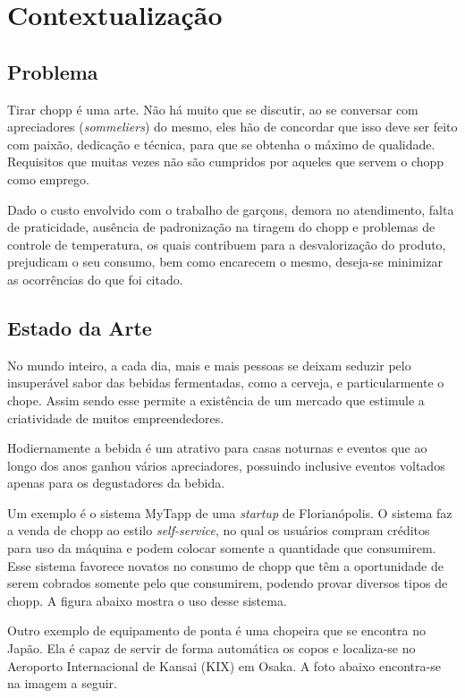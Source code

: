 \chapter[Contextualização]{Contextualização}

\section{Problema}

		Tirar chopp é uma arte.  Não há muito que se discutir, ao se conversar com apreciadores (\textit{sommeliers}) do mesmo,  eles hão de concordar que isso  deve ser feito com paixão, dedicação  e técnica, para que se obtenha o máximo de qualidade. Requisitos que muitas vezes não são cumpridos por aqueles que servem o chopp como emprego.
        
        Dado o custo  envolvido com o trabalho de garçons, demora no atendimento, falta de praticidade, ausência de padronização na tiragem do chopp e problemas de controle de temperatura, os quais contribuem para a desvalorização do produto, prejudicam o seu consumo, bem como encarecem o mesmo, deseja-se minimizar as ocorrências do que  foi citado. 


\section{Estado da Arte}

No mundo inteiro, a cada dia, mais e mais pessoas se deixam seduzir pelo insuperável sabor das bebidas fermentadas, como a cerveja, e particularmente o chope. Assim sendo esse permite a existência de um mercado que estimule a criatividade de muitos empreendedores.

Hodiernamente a bebida é um atrativo para casas noturnas e eventos que ao longo dos anos ganhou vários apreciadores, possuindo inclusive eventos voltados apenas para os degustadores da bebida. 

Um exemplo é o sistema MyTapp de uma \textit{startup} de Florianópolis.  O sistema faz a venda de chopp ao estilo \textit{self-service}, no qual os usuários compram créditos para uso da máquina e podem colocar somente a quantidade que consumirem. Esse sistema favorece novatos no consumo de chopp que têm a oportunidade de serem cobrados somente pelo que consumirem, podendo provar diversos tipos de chopp. A figura abaixo mostra o uso desse sistema.

Outro exemplo de equipamento de ponta é uma chopeira  que se encontra no Japão. Ela é capaz de servir de forma automática os copos e localiza-se no Aeroporto Internacional de Kansai (KIX) em Osaka. A foto abaixo encontra-se na imagem a seguir.

